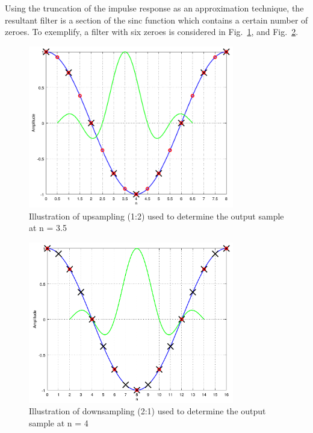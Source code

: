 Using the truncation of the impulse response as an approximation technique, the
resultant filter is a section of the sinc function which contains a certain
number of zeroes. To exemplify, a filter with six zeroes is considered in
Fig.~\ref{fig:exemp_upsamp}, and Fig.~\ref{fig:exemp_downsamp}.

\begin{figure}[!htb]
  \centering
  \includegraphics[width=0.8\textwidth]{Figures/upsample_example.png}
  \caption{Illustration of upsampling (1:2) used to determine the output sample
    at n = 3.5}
  \label{fig:exemp_upsamp}
\end{figure}

\begin{figure}[!htb]
  \centering
  \includegraphics[width=0.8\textwidth]{Figures/downsample_example.png}
  \caption{Illustration of downsampling (2:1) used to determine the output
    sample at n = 4}
  \label{fig:exemp_downsamp}
\end{figure}


